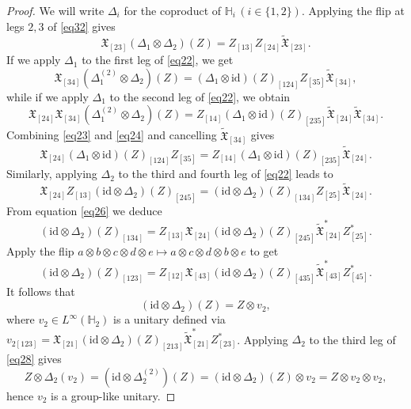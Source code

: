 \documentclass[reqno]{amsart}
\numberwithin{equation}{section}
\newcommand{\id}{\mathrm{id}}
\newcommand{\Hh}{\mathbb{H}}
\newcommand{\mf}{\mathfrak}
\begin{document}
\begin{proof}
We will write $\Delta_i$ for the coproduct of $\Hh_i\,(i\in\{1,2\})$. Applying the flip at legs $2,3$ of \eqref{eq32} gives
\begin{equation}\label{eq22}
\mf{X}_{[23]}(\Delta_{1}\otimes\Delta_{2 })(Z)=
Z_{[13]} Z_{[24]} \widetilde{\mf{X}}_{[23]}.
\end{equation}
If we apply $\Delta_1$ to the first leg of \eqref{eq22}, we get
\begin{equation}\label{eq23}
\mf{X}_{[34]} (\Delta_1^{(2)}\otimes \Delta_2)(Z)=
(\Delta_1\otimes \id)(Z)_{[124]} Z_{[35]}
\widetilde{\mf{X}}_{[34]},
\end{equation}
while if we apply $\Delta_1$ to the second leg of \eqref{eq22}, we obtain
\begin{equation}\label{eq24}
\mf{X}_{[24]} \mf{X}_{[34]}
(\Delta_1^{(2)}\otimes \Delta_2)(Z)=
Z_{[14]} (\Delta_1\otimes\id)(Z)_{[235]}
\widetilde{\mf{X}}_{[24]}
\widetilde{\mf{X}}_{[34]}.
\end{equation}
Combining \eqref{eq23} and \eqref{eq24} and cancelling $\widetilde{\mf{X}}_{[34]}$ gives
\begin{equation}\label{eq25}
\mf{X}_{[24]} 
(\Delta_1\otimes \id)(Z)_{[124]} Z_{[35]}
=
Z_{[14]} (\Delta_1\otimes\id)(Z)_{[235]}
\widetilde{\mf{X}}_{[24]}.
\end{equation}
Similarly, applying $\Delta_2$ to the third and fourth leg of \eqref{eq22} leads to
\begin{equation}\label{eq26}
\mf{X}_{[24]}
Z_{[13]} (\id\otimes\Delta_2)(Z)_{[245]}
=
(\id\otimes\Delta_2)(Z)_{[134]}
Z_{[25]}
\widetilde{\mf{X}}_{[24]}.
\end{equation}
From equation \eqref{eq26} we deduce
\[
 (\id\otimes \Delta_2)(Z)_{[134]}=
Z_{[13]} \mf{X}_{[24]} (\id\otimes\Delta_2)(Z)_{[245]} \widetilde{\mf{X}}_{[24]}^* Z_{[25]}^*.
\]
Apply the flip $a\otimes b\otimes c\otimes d\otimes e\mapsto a\otimes c\otimes d \otimes b \otimes e$ to get
\[
 (\id\otimes \Delta_2)(Z)_{[123]}=
 Z_{[12]}
\mf{X}_{[43]} (\id\otimes\Delta_2)(Z)_{[435]} \widetilde{\mf{X}}_{[43]}^* Z_{[45]}^*.
\]
It follows that
\begin{equation}\label{eq28}
(\id\otimes \Delta_2)(Z)=Z\otimes v_2,
\end{equation}
where $v_2\in L^{\infty}(\Hh_2)$ is a unitary defined via $v_{2 [123]}=\mf{X}_{[21]} (\id\otimes \Delta_2)(Z)_{[213]} \widetilde{\mf{X}}^*_{[21]}Z^*_{[23]}$. Applying $\Delta_2$ to the third leg of \eqref{eq28} gives
\[
Z\otimes \Delta_2(v_2)=
(\id\otimes \Delta_2^{(2)})(Z)=
(\id\otimes \Delta_2)(Z)\otimes v_2=
Z\otimes v_2\otimes v_2,
\]
hence $v_2$ is a group-like unitary. 


\end{proof}
\end{document}

